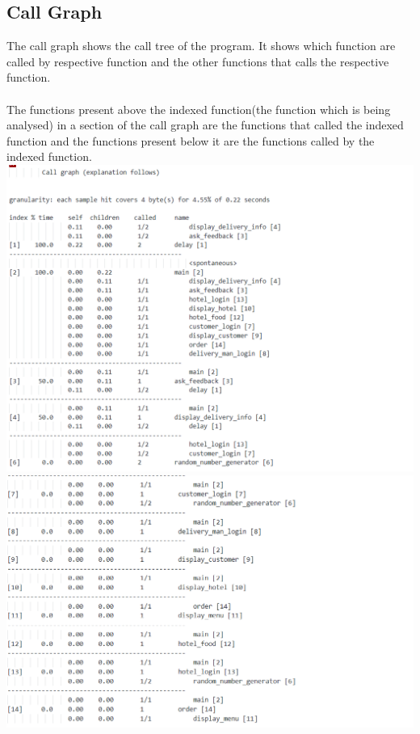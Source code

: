\documentclass[12pt]{article}
\begin{document}
\subsection{Call Graph}
The call graph shows the call tree of the program. It shows which function are called by respective function and the other functions that calls the respective function.\\
\\
The functions present above the indexed function(the function which is being analysed) in a section of the call graph are the functions that called the indexed function and the functions present below it are the functions called by the indexed function. \\
\includegraphics{profile_3.png}\\
\includegraphics{profile_4.png}\\
\end{document}
